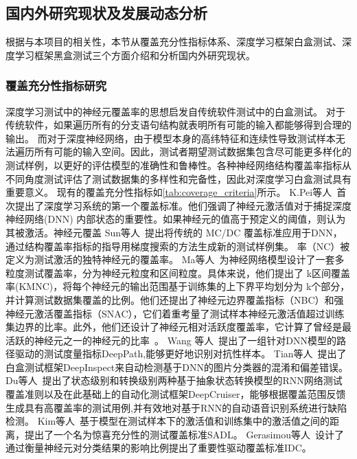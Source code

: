 
\subsection{国内外研究现状及发展动态分析}\label{relatedwork}


根据与本项目的相关性，本节从覆盖充分性指标体系、深度学习框架白盒测试、深度学习框架黑盒测试三个方面介绍和分析国内外研究现状。




\subsubsection{覆盖充分性指标研究}
深度学习测试中的神经元覆盖率的思想启发自传统软件测试中的白盒测试。
对于传统软件，如果遍历所有的分支语句结构就表明所有可能的输入都能够得到合理的输出。
而对于深度神经网络，由于模型本身的高纬特征和连续性导致测试样本无法遍历所有可能的输入空间。因此，测试者期望测试数据集包含尽可能更多样化的测试样例，以更好的评估模型的准确性和鲁棒性。各种神经网络结构覆盖率指标从不同角度测试评估了测试数据集的多样性和完备性，因此对深度学习白盒测试具有重要意义。 
现有的覆盖充分性指标如\cref{tab:coverage_criteria}所示。
K.Pei等人~首次提出了深度学习系统的第一个覆盖标准。他们强调了神经元激活值对于捕捉深度神经网络(DNN) 内部状态的重要性。如果神经元的值高于预定义的阈值，则认为其被激活。神经元覆盖
Sun等人~提出将传统的 MC/DC 覆盖标准应用于DNN，通过结构覆盖率指标的指导用梯度搜索的方法生成新的测试样例集。
率（NC）被定义为测试激活的独特神经元的覆盖率。
Ma等人~为神经网络模型设计了一套多粒度测试覆盖率，分为神经元粒度和区间粒度。具体来说，他们提出了 k区间覆盖率(KMNC)，将每个神经元的输出范围基于训练集的上下界平均划分为 k个部分，并计算测试数据集覆盖的比例。他们还提出了神经元边界覆盖指标（NBC）和强神经元激活覆盖指标（SNAC），它们着重考量了测试样本神经元激活值超过训练集边界的比率。此外，他们还设计了神经元相对活跃度覆盖率，它计算了曾经是最活跃的神经元之一的神经元的比率~。
Wang 等人~提出了一组针对DNN模型的路径驱动的测试度量指标DeepPath,能够更好地识别对抗性样本。
Tian等人~提出了白盒测试框架DeepInspect来自动检测基于DNN的图片分类器的混淆和偏差错误。
Du等人~提出了状态级别和转换级别两种基于抽象状态转换模型的RNN网络测试覆盖准则以及在此基础上的自动化测试框架DeepCruiser，能够根据覆盖范围反馈生成具有高覆盖率的测试用例,并有效地对基于RNN的自动语音识别系统进行缺陷检测。
Kim等人~基于模型在测试样本下的激活值和训练集中的激活值之间的距离，提出了一个名为惊喜充分性的测试覆盖标准SADL。
Gerasimou等人~设计了通过衡量神经元对分类结果的影响比例提出了重要性驱动覆盖标准IDC。

